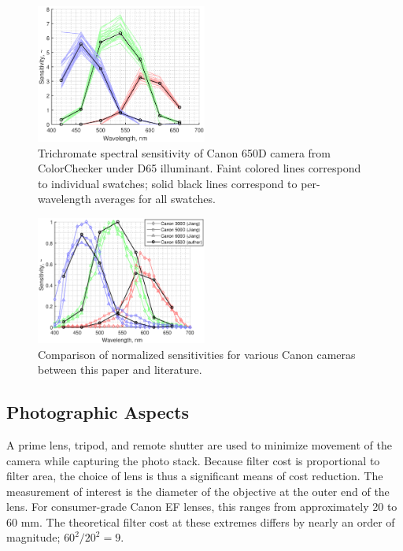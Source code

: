 \documentclass[twocolumn,10pt]{asme2ej}
\begin{document}
\begin{figure}
\centering
\includegraphics[width=0.5\textwidth]{canon_650d_sensitivity.eps}
\caption{Trichromate spectral sensitivity of Canon 650D camera from ColorChecker under D65 illuminant. Faint colored lines correspond to individual swatches; solid black lines correspond to per-wavelength averages for all swatches.}
\label{canon_650d_sensitivity}
\end{figure}

\begin{figure}
\centering
\includegraphics[width=0.5\textwidth]{camera_spectral_sensitivities.eps}
\caption{Comparison of normalized sensitivities for various Canon cameras between this paper and literature. \cite{Jiang}}
\label{camera_spectral_sensitivities}
\end{figure}

\subsection{Photographic Aspects}
\label{photographic}

\noindent A prime lens, tripod, and remote shutter are used to minimize movement of the camera while capturing the photo stack. Because filter cost is proportional to filter area, the choice of lens is thus a significant means of cost reduction. The measurement of interest is the diameter of the objective at the outer end of the lens. For consumer-grade Canon EF lenses, this ranges from approximately 20 to 60 mm. The theoretical filter cost at these extremes differs by nearly an order of magnitude; $60^2 / 20^2 = 9$.
\end{document}
